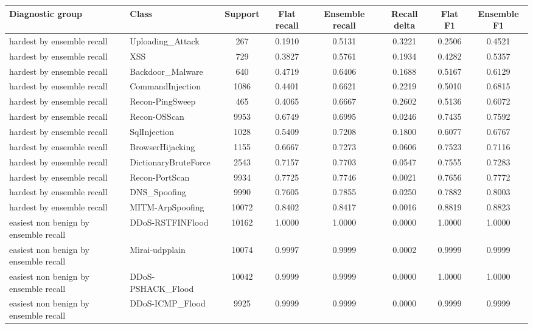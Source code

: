 \documentclass[10pt]{article}
\begin{document}
\begin{center}
\tiny
\setlength{\tabcolsep}{2pt}
\begin{longtable}{p{2.7cm}p{2.5cm}cccccc}
\toprule
Diagnostic group & Class & Support & Flat recall & Ensemble recall & Recall delta & Flat F1 & Ensemble F1 \\
\midrule
\endhead
hardest by ensemble recall & Uploading\_Attack & 267 & 0.1910 & 0.5131 & 0.3221 & 0.2506 & 0.4521 \\
hardest by ensemble recall & XSS & 729 & 0.3827 & 0.5761 & 0.1934 & 0.4282 & 0.5357 \\
hardest by ensemble recall & Backdoor\_Malware & 640 & 0.4719 & 0.6406 & 0.1688 & 0.5167 & 0.6129 \\
hardest by ensemble recall & CommandInjection & 1086 & 0.4401 & 0.6621 & 0.2219 & 0.5010 & 0.6815 \\
hardest by ensemble recall & Recon-PingSweep & 465 & 0.4065 & 0.6667 & 0.2602 & 0.5136 & 0.6072 \\
hardest by ensemble recall & Recon-OSScan & 9953 & 0.6749 & 0.6995 & 0.0246 & 0.7435 & 0.7592 \\
hardest by ensemble recall & SqlInjection & 1028 & 0.5409 & 0.7208 & 0.1800 & 0.6077 & 0.6767 \\
hardest by ensemble recall & BrowserHijacking & 1155 & 0.6667 & 0.7273 & 0.0606 & 0.7523 & 0.7116 \\
hardest by ensemble recall & DictionaryBruteForce & 2543 & 0.7157 & 0.7703 & 0.0547 & 0.7555 & 0.7283 \\
hardest by ensemble recall & Recon-PortScan & 9934 & 0.7725 & 0.7746 & 0.0021 & 0.7656 & 0.7772 \\
hardest by ensemble recall & DNS\_Spoofing & 9990 & 0.7605 & 0.7855 & 0.0250 & 0.7882 & 0.8003 \\
hardest by ensemble recall & MITM-ArpSpoofing & 10072 & 0.8402 & 0.8417 & 0.0016 & 0.8819 & 0.8823 \\
easiest non benign by ensemble recall & DDoS-RSTFINFlood & 10162 & 1.0000 & 1.0000 & 0.0000 & 1.0000 & 1.0000 \\
easiest non benign by ensemble recall & Mirai-udpplain & 10074 & 0.9997 & 0.9999 & 0.0002 & 0.9999 & 0.9999 \\
easiest non benign by ensemble recall & DDoS-PSHACK\_Flood & 10042 & 0.9999 & 0.9999 & 0.0000 & 1.0000 & 1.0000 \\
easiest non benign by ensemble recall & DDoS-ICMP\_Flood & 9925 & 0.9999 & 0.9999 & 0.0000 & 0.9999 & 0.9999 \\

\end{longtable}
\end{center}
\end{document}
